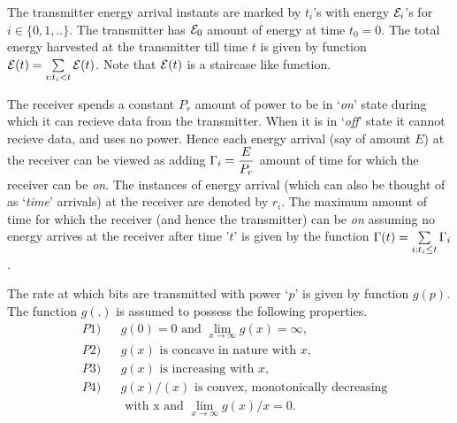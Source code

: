 The transmitter energy arrival instants are marked by $t_i$'s with energy $\mathcal{E}_i$'s for $i \in \{0,1,..\}$. The transmitter has $\mathcal{E}_0$ amount of energy at time $t_0=0$. The total energy harvested at the transmitter till time $t$ is given by function $\mathcal{E}(t)=\sum\limits_{i:t_i < t}\mathcal{E}(t)$. Note that $\mathcal{E}(t)$ is a staircase like function.
 
The receiver spends a constant $P_{r}$ amount of power to be in `\textit{on}' state during which it can recieve data from the transmitter. When it is in `\textit{off}' state it cannot recieve data, and uses no power. Hence each energy arrival (say of amount $E$) at the receiver can be viewed as adding $\Gamma_i=\dfrac{E}{P_{r}}$ amount of time for which the receiver can be \textit{on}. The instances of energy arrival (which can also be thought of as `\textit{time}' arrivals) at the receiver are denoted by $r_i$. The maximum amount of time for which the receiver (and hence the transmitter) can be \textit{on} assuming no energy arrives at the receiver after time '$t$' is given by the function $\Gamma(t)=\sum\limits_{i:t_i\leq t} \Gamma_i$.

The rate at which bits are transmitted with power `$p$' is given by function $g(p)$. The function $g(.)$ is assumed to possess the following properties. 
\begin{align}
&P1) &&g(0)=0\text{ and }\lim_{x\rightarrow \infty} g(x)= \infty,\label{property_0_infty}
\\
&P2) &&g(x)\text{ is concave in nature with } x,\label{property_concave}
\\
&P3) &&g(x)\text{ is increasing with } x,\label{property_increasing}
\\ 
&P4) &&g(x)/(x) \text{ is convex, monotonically decreasing} \nonumber
\\
&    &&\text{ with x and } \lim_{x\rightarrow \infty} g(x)/x= 0.\label{property_decreasing}
\end{align}


